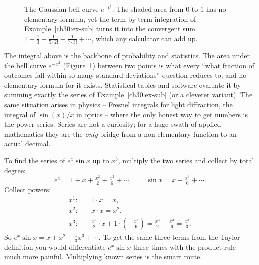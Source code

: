 \begin{figure}[H]
\centering
{}
\caption{The Gaussian bell curve $e^{-t^2}$. The shaded area from $0$ to $1$ has no elementary formula, yet the term-by-term integration of Example~\ref{ch30:ex-sub} turns it into the convergent sum $1 - \tfrac13 + \tfrac{1}{5\cdot 2!} - \tfrac{1}{7\cdot 3!} + \cdots$, which any calculator can add up.}
\label{ch30:fig-gaussian}
\end{figure}

\begin{applicationbox}
The integral above is the backbone of probability and statistics. The area under the bell curve $e^{-x^2}$ (Figure~\ref{ch30:fig-gaussian}) between two points is what every ``what fraction of outcomes fall within so many standard deviations'' question reduces to, and no elementary formula for it exists. Statistical tables and software evaluate it by summing exactly the series of Example~\ref{ch30:ex-sub} (or a cleverer variant). The same situation arises in physics -- Fresnel integrals for light diffraction, the integral of $\sin(x)/x$ in optics -- where the only honest way to get numbers is the power series. Series are not a curiosity; for a huge swath of applied mathematics they are the \emph{only} bridge from a non-elementary function to an actual decimal.
\end{applicationbox}

\begin{example}
\label{ch30:ex-mult}
To find the series of $e^x \sin x$ up to $x^3$, multiply the two series and collect by total degree:
\[
  e^x = 1 + x + \tfrac{x^2}{2} + \tfrac{x^3}{6} + \cdots,
  \qquad
  \sin x = x - \tfrac{x^3}{6} + \cdots.
\]
Collect powers:
\[
\begin{aligned}
  x^1:&\quad 1\cdot x = x,\\
  x^2:&\quad x\cdot x = x^2,\\
  x^3:&\quad \tfrac{x^2}{2}\cdot x + 1\cdot\left(-\tfrac{x^3}{6}\right) = \tfrac{x^3}{2} - \tfrac{x^3}{6} = \tfrac{x^3}{3}.
\end{aligned}
\]
So $e^x \sin x = x + x^2 + \tfrac{1}{3}x^3 + \cdots$. To get the same three terms from the Taylor definition you would differentiate $e^x \sin x$ three times with the product rule -- much more painful. Multiplying known series is the smart route.
\end{example}

